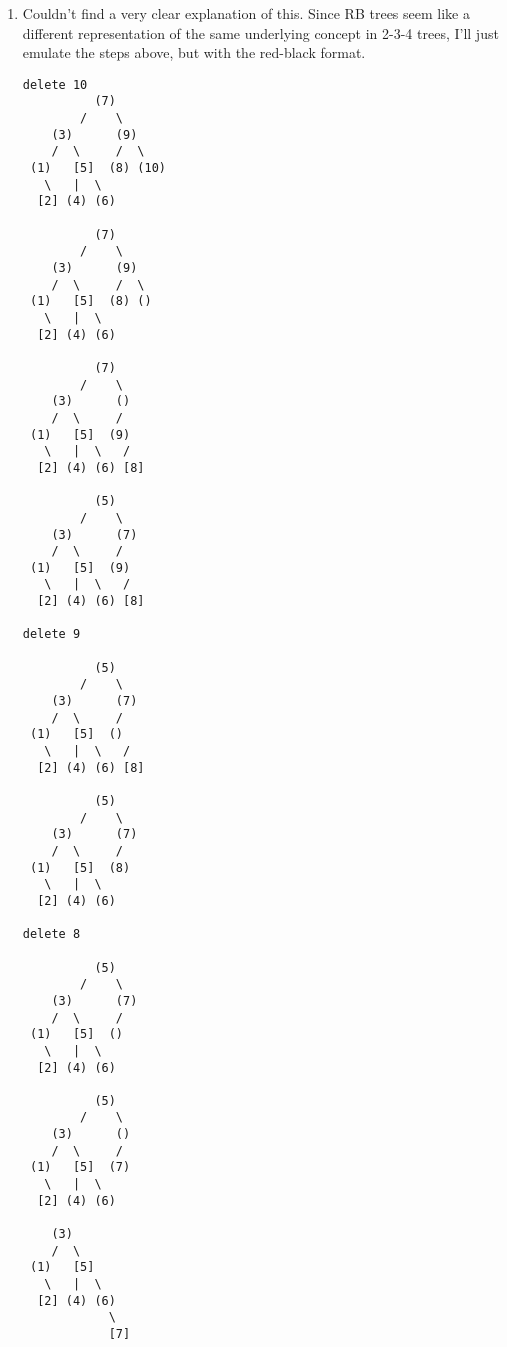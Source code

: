 \documentclass{article}
\begin{document}
\begin{enumerate}
\begin{enumerate}
\begin{enumerate}
\begin{verbatim}
delete 9

          [5]
        /     \
    [3]        [7]
   /   |  \    /
[1,2] [4] [6] [8]

delete 8

          [5]
        /     \
    [3]        [7]
   /   |  \    /
[1,2] [4] [6] []

          [5]
        /     \
    [3]        []
   /   |  \    /
[1,2] [4] [6] [7]

          []
        /
    [3,5]
   /   |  \
[1,2] [4] [6,7]

    [3,5]
   /   |  \
[1,2] [4] [6,7]

delete 7

    [3,5]
   /   |  \
[1,2] [4] [6]

\end{verbatim}

  \item[\emph{(d)}]

Couldn't find a very clear explanation of this. Since RB trees seem like a
different representation of the same underlying concept in 2-3-4 trees, I'll
just emulate the steps above, but with the red-black format.

\begin{verbatim}
delete 10
          (7)
        /    \
    (3)      (9)
    /  \     /  \
 (1)   [5]  (8) (10)  
   \   |  \ 
  [2] (4) (6)

          (7)
        /    \
    (3)      (9)
    /  \     /  \
 (1)   [5]  (8) ()  
   \   |  \ 
  [2] (4) (6)

          (7)
        /    \
    (3)      ()
    /  \     /
 (1)   [5]  (9)
   \   |  \   /
  [2] (4) (6) [8]

          (5)
        /    \
    (3)      (7)
    /  \     /
 (1)   [5]  (9)
   \   |  \   /
  [2] (4) (6) [8]

delete 9 

          (5)
        /    \
    (3)      (7)
    /  \     /
 (1)   [5]  ()
   \   |  \   /
  [2] (4) (6) [8]

          (5)
        /    \
    (3)      (7)
    /  \     /
 (1)   [5]  (8)
   \   |  \
  [2] (4) (6)

delete 8 

          (5)
        /    \
    (3)      (7)
    /  \     /
 (1)   [5]  ()
   \   |  \
  [2] (4) (6)

          (5)
        /    \
    (3)      ()
    /  \     /
 (1)   [5]  (7)
   \   |  \
  [2] (4) (6)

    (3)
    /  \
 (1)   [5]
   \   |  \
  [2] (4) (6)
            \
            [7]


\end{verbatim}
\end{enumerate}
\end{enumerate}
\end{enumerate}
\end{document}
